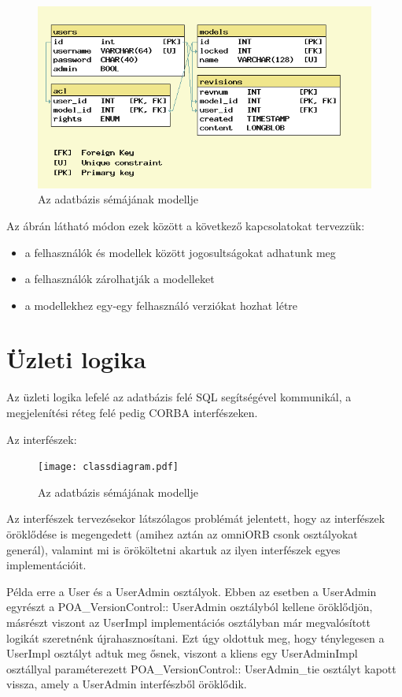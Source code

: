 \documentclass[a4paper,12pt]{article}
\begin{document}
\begin{figure}[H]
\centering
\includegraphics[width=120mm,keepaspectratio]{sqlschema.png}
\caption{Az adatbázis sémájának modellje}
\end{figure}

Az ábrán látható módon ezek között a következő kapcsolatokat tervezzük:

\begin{itemize}
\item a felhasználók és modellek között jogosultságokat adhatunk meg
\item a felhasználók zárolhatják a modelleket
\item a modellekhez egy-egy felhasználó verziókat hozhat létre
\end{itemize}

\clearpage
\section{Üzleti logika}

Az üzleti logika lefelé az adatbázis felé SQL segítségével kommunikál, a
megjelenítési réteg felé pedig CORBA interfészeken.

Az interfészek:

\begin{figure}[H]
\centering
\texttt{[image: classdiagram.pdf]}
\caption{Az adatbázis sémájának modellje}
\end{figure}

\clearpage
Az interfészek tervezésekor látszólagos problémát jelentett, hogy az
interfészek öröklődése is megengedett (amihez aztán az omniORB csonk
osztályokat generál), valamint mi is örököltetni akartuk az ilyen interfészek
egyes implementációit.

Példa erre a User és a UserAdmin osztályok. Ebben az esetben a UserAdmin
egyrészt a POA\_VersionControl:: UserAdmin osztályból kellene öröklődjön,
másrészt viszont az UserImpl implementációs osztályban már megvalósított
logikát szeretnénk újrahasznosítani. Ezt úgy oldottuk meg, hogy ténylegesen a
UserImpl osztályt adtuk meg ősnek, viszont a kliens egy UserAdminImpl
osztállyal paraméterezett POA\_VersionControl:: UserAdmin\_tie osztályt kapott
vissza, amely a UserAdmin interfészből öröklődik.
\end{document}
